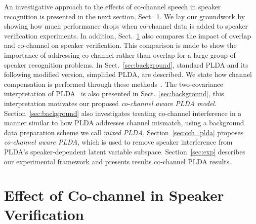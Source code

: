 An investigative approach to the effects of co-channel speech in speaker recognition is presented in the next section, Sect.~\ref{sec:cochannl_in_sid}. 
We lay our groundwork by showing how much performance drops when co-channel data is added to speaker verification experiments. In addition, Sect.~\ref{sec:cochannl_in_sid} also compares the impact of overlap and co-channel on speaker verification. 
This comparison is made to show the importance of addressing co-channel rather than overlap for a large group of speaker recognition problems. 
In Sect.~\ref{sec:background}, standard PLDA and its following modified version, simplified PLDA, are described. 
We state how channel compensation is performed through these methods~\cite{prince_plda,kenny_plda}. 
The two-covariance interpretation of PLDA~\cite{ioffePLDA2006} is also presented in Sect.~\ref{sec:background}, this interpretation motivates our proposed {\it co-channel aware PLDA model}. 
Section~\ref{sec:background} also investigates treating co-channel interference in a manner similar to how PLDA addresses channel mismatch, using a background data preparation scheme we call {\it mixed PLDA}. 
Section~\ref{sec:cch_plda} proposes {\it co-channel aware PLDA}, which is used to remove speaker interference from PLDA's speaker-dependent latent variable subspace. 
Section~\ref{sec:exp} describes our experimental framework and presents results co-channel PLDA results. 

\section{Effect of Co-channel in Speaker Verification}
\label{sec:cochannl_in_sid}


